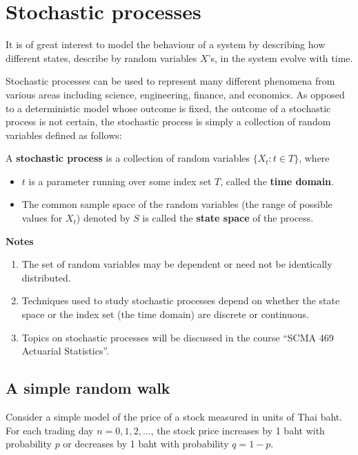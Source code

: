 \documentclass[landscape, 20pt]{extreport}
\theoremstyle{definition}
\theoremstyle{definition}
\theoremstyle{definition}
\theoremstyle{definition}
\theoremstyle{remark}
\begin{document}
\hypertarget{stochastic-processes}{%
\section{Stochastic processes}\label{stochastic-processes}}

It is of great interest to model the behaviour of a system by describing
how different states, describe by random variables \(X\)'s, in the system
evolve with time.

Stochastic processes can be used to represent many different phenomena
from various areas including science, engineering, finance, and
economics. As opposed to a deterministic model whose outcome is fixed,
the outcome of a stochastic process is not certain, the stochastic
process is simply a collection of random variables defined as follows:

A \textbf{stochastic process} is a collection of random variables
\(\{ X_t : t \in T\}\), where

\begin{itemize}
\item
  \(t\) is a parameter running over some index set \(T\), called the
  \textbf{time domain}.
\item
  The common sample space of the random variables (the range of
  possible values for \(X_t\)) denoted by \(S\) is called the \textbf{state
  space} of the process.
\end{itemize}

\textbf{Notes}

\begin{enumerate}
\def\labelenumi{\arabic{enumi}.}
\item
  The set of random variables may be dependent or need not be
  identically distributed.
\item
  Techniques used to study stochastic processes depend on whether the
  state space or the index set (the time domain) are discrete or
  continuous.
\item
  Topics on stochastic processes will be discussed in the course ``SCMA
  469 Actuarial Statistics''.
\end{enumerate}

\hypertarget{a-simple-random-walk}{%
\subsection{A simple random walk}\label{a-simple-random-walk}}

Consider a simple model of the price of a stock measured in units of
Thai baht. For each trading day \(n = 0,1,2, \ldots\), the stock price
increases by 1 baht with probability \(p\) or decreases by 1 baht with
probability \(q = 1-p\).
\end{document}
